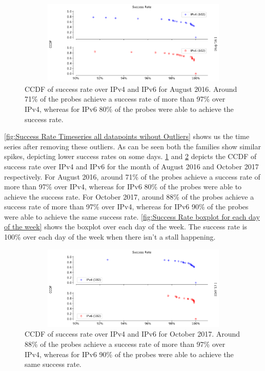 \begin{figure}[!ht]
	\centering
	\includegraphics[keepaspectratio, height=4cm, width=15cm]{figures/success/netflix-success-rate-ccdf-aug-2016.pdf}
	\caption[Success Rate CCDF for August 2016]{CCDF of success rate over IPv4 and IPv6 for August 2016. Around 71\% of the probes achieve a success rate of more than 97\% over IPv4, whereas for IPv6 80\% of the probes were able to achieve the success rate.}
	\label{fig:Success Rate for August 2016}
\end{figure}
\cref{fig:Success Rate Timeseries all datapoints wihout Outliers} shows us the time series after removing these outliers. As can be seen both the families show similar spikes, 
depicting lower success rates on some days.
\cref{fig:Success Rate for August 2016} and \cref{fig:Success Rate CCDF for October 2017} depicts the CCDF of success rate over IPv4 and IPv6 for the month of August 2016 and 
October 2017 respectively.
For August 2016, around 71\% of the probes achieve a success rate of more than 97\% over IPv4, whereas for IPv6 80\% of the probes were able to achieve the success rate.
For October 2017, around 88\% of the probes achieve a success rate of more than 97\% over IPv4, whereas for IPv6 90\% of the probes were able to achieve the same success rate.
\cref{fig:Success Rate boxplot for each day of the week} shows the boxplot over each day of the week. The success rate is 100\% over each day of the week when there isn't a stall happening.
\begin{figure}[!ht]
	\centering
	\includegraphics[keepaspectratio, height=4cm, width=15cm]{figures/success/netflix-success-rate-ccdf-oct-2017.pdf}
	\caption[Success Rate CCDF for Ocotber 2017]{CCDF of success rate over IPv4 and IPv6 for October 2017. Around 88\% of the probes achieve a success rate of more than 97\% over IPv4, whereas for IPv6 90\% of the probes were able to achieve the same success rate.}
	\label{fig:Success Rate CCDF for October 2017}
\end{figure}
